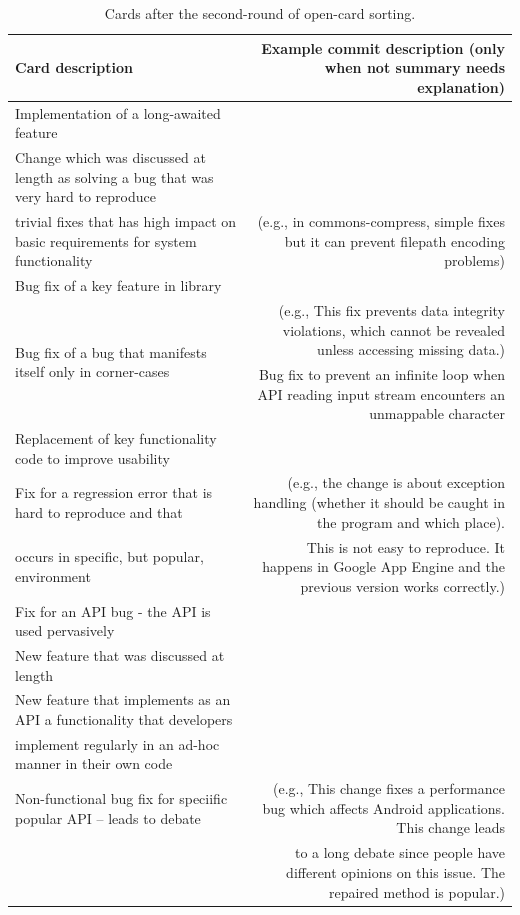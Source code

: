 \begin{landscape}
  
 \begin{table}
 \centering
 \caption{Cards after the second-round of open-card sorting.}
 \scriptsize
 	\begin{tabular}{l|r}
 	\bf Card description & \bf Example commit description (only when not summary needs explanation) \\
 	\hline
 	\hline
 		Implementation of a long-awaited feature & \\ \hline
 		Change which was discussed at length as solving a bug that was very hard to reproduce &	\\ \hline
 		trivial fixes that has high impact on basic requirements for system functionality & (e.g., in commons-compress, simple fixes but it can prevent filepath encoding problems)	\\ \hline
 		Bug fix of a key feature in library & \\ \hline
 		\multirow{2}{*}{Bug fix of a bug that manifests itself only in corner-cases} & (e.g., This fix prevents data integrity violations, which cannot be revealed unless accessing missing data.)\\
 		& Bug fix to prevent an infinite loop when API reading input stream encounters an unmappable character \\
 		\hline
 		Replacement of key functionality code to improve usability & \\ \hline
 		Fix for a regression error that is hard to reproduce and that & (e.g., the change is about exception handling (whether it should be 	caught in the program and which place). \\ 
 		occurs in specific, but popular, environment  &This is not easy to reproduce. It happens in Google App Engine and the previous version works correctly.) \\ \hline
 		Fix for an API bug - the API is used pervasively	 & \\\hline
		New feature that was discussed at length	 & \\\hline
 		New feature that implements as an API a functionality that developers 		&	\\
 		implement regularly in an ad-hoc manner in their own code & \\ \hline
		Non-functional bug fix for speciific popular API -- leads to debate & (e.g., This change fixes a performance bug which affects Android applications. This change leads \\
&  to a long 	debate	since people have different opinions on this issue. The repaired method is popular.)\\ \hline

\end{tabular}
\end{table}
\end{landscape}
